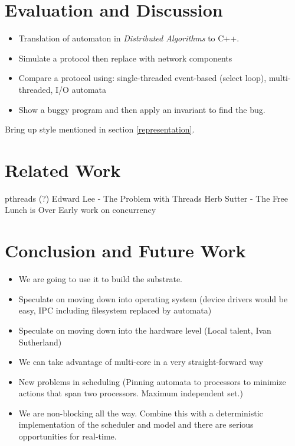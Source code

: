 \documentclass[letterpaper]{article}
\begin{document}
\vspace{2 mm}


\section{Evaluation and Discussion\label{evaluation}}

\begin{itemize}
\item Translation of automaton in \emph{Distributed Algorithms} to C++.
\item Simulate a protocol then replace with network components
\item Compare a protocol using: single-threaded event-based (select loop), multi-threaded, I/O automata
\item Show a buggy program and then apply an invariant to find the bug.
\end{itemize}

Bring up style mentioned in section \ref{representation}.

\section{Related Work\label{related_work}}

pthreads (?)
Edward Lee - The Problem with Threads
Herb Sutter - The Free Lunch is Over
Early work on concurrency

\section{Conclusion and Future Work\label{conclusion}}

\begin{itemize}
  \item We are going to use it to build the substrate.
  \item Speculate on moving down into operating system (device drivers would be easy, IPC including filesystem replaced by automata)
  \item Speculate on moving down into the hardware level (Local talent, Ivan Sutherland)
  \item We can take advantage of multi-core in a very straight-forward way
  \item New problems in scheduling (Pinning automata to processors to minimize actions that span two processors.  Maximum independent set.)
  \item We are non-blocking all the way.  Combine this with a deterministic implementation of the scheduler and model and there are serious opportunities for real-time.
\end{itemize}
\end{document}
